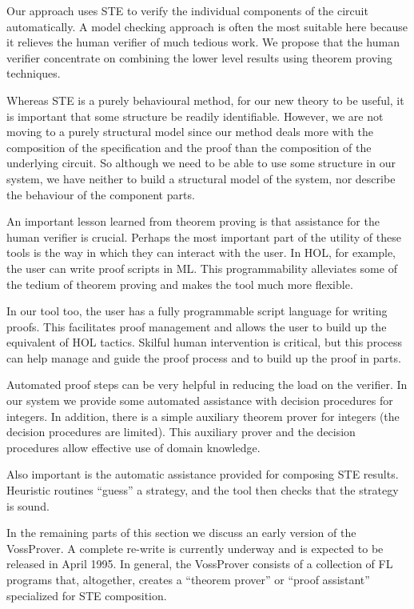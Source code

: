 Our approach uses STE to verify the individual 
components of the circuit automatically. A model
checking approach is often the most suitable here
because it relieves the human verifier of much
tedious work. We propose that the human verifier
concentrate on combining the lower level results
using theorem proving techniques.

Whereas STE is a purely
behavioural method, for our new theory to be useful,
it is important that some structure be readily
identifiable.  However, we are not moving to a purely
structural model since our method deals more with the
composition of the specification and the proof than
the composition of the underlying circuit. So
although we need to be able to use some structure in
our system, we have neither to build a structural
model of the system, nor describe the behaviour of
the component parts.  

An important lesson learned from theorem proving
is that assistance for the human verifier is
crucial. 
Perhaps the most important part of the utility of
these tools is the way in which they can interact
with the user. In HOL, for example, the user can
write proof scripts in ML. This programmability
alleviates some of the tedium of theorem proving and
makes the tool much more flexible. 

In our tool too, the user has a fully programmable
script language for writing proofs.
This facilitates proof management and allows
the user to build up the equivalent of
HOL tactics. Skilful human intervention is
critical, but this process can help manage
and guide the proof process and to build
up the proof in parts.

Automated proof steps can be very helpful in
reducing the load on the verifier. In our
system we provide some automated assistance
with decision procedures for integers. 
In addition, there is a simple auxiliary 
theorem prover for integers (the decision
procedures are limited). This auxiliary prover
and the decision procedures allow effective
use of domain knowledge.

Also important is the automatic assistance 
provided for composing STE results. Heuristic
routines ``guess'' a strategy, and the tool
then checks that the strategy is sound.

In the remaining parts of this section we discuss an early
version of the VossProver.
A complete re-write is currently underway and is expected to be
released in April 1995.
In general, the VossProver consists of a collection of FL programs
that, altogether, creates a ``theorem prover'' or ``proof assistant''
specialized for STE composition.


